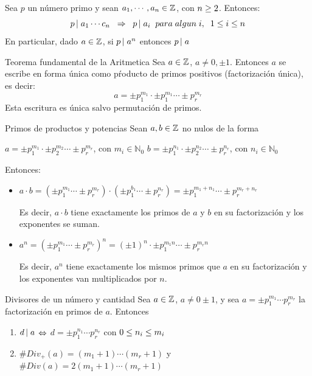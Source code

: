 \documentclass[10pt]{article}
\newcommand{\nat}[1]{\mathbb{N}^{#1}}
\begin{document}
\begin{propo}{}
 Sea $p$ un número primo y sean $a_1, \cdots, a_n \in \entero{}$, con $n \mayig2$. Entonces:
 \[\divi{p}{a_1} \cdots c_n \es{0.2} \implica \es{0.2} \divi{p}{a_i}\es{0.2} para \es{0.1} algun \es{0.1} i, \es{0.2} 1 \menig i \menig n\]
 En particular, dado $a \in \entero{}$, si $\divi{p}{a^n}$ entonces $\divi{p}{a}$
\end{propo}

\begin{teo}{Teorema fundamental de la Aritmetica}
 Sea $a \in \entero{}$, $a \neq 0, \pm 1$. Entonces $a$ se escribe en forma única como pŕoducto de primos positivos (factorización única), es decir:
 \[a = \pm p_1^{m_1} \cdot \pm p_1^{m_1} \cdots \pm p_r^{m_r} \]
 Esta escritura es única salvo permutación de primos.
\end{teo}

\begin{obs}{Primos de productos y potencias}
Sean $a,b \in \entero{}$ no nulos de la forma 
\begin{center}
 $a = \pm p_1^{m_1} \cdot \pm p_2^{m_2} \cdots \pm p_r^{m_r}$, con $m_i \in \nat{}_0$
 $b = \pm p_1^{n_1} \cdot \pm p_2^{n_2} \cdots \pm p_r^{n_r}$, con $n_i \in \nat{}_0$
 \end{center}
 Entonces:
 \begin{itemize}
  \item $a \cdot b = (\pm p_1^{m_1}  \cdots \pm p_r^{m_r}) \cdot (\pm p_1^{b_1}  \cdots \pm p_r^{n_r}) = \pm p_1^{m_1 + n_1}  \cdots \pm p_r^{m_r + n_r}$
  
  Es decir, $a \cdot b$ tiene exactamente los primos de $a$ y $b$ en su factorización y los exponentes se suman.
  \item $a^n = (\pm p_1^{m_1}  \cdots \pm p_r^{m_r})^n = (\pm 1)^n \cdot \pm p_1^{m_1 n}  \cdots \pm p_r^{m_r n}$
  
  Es decir, $a^n$ tiene exactamente los mismos primos que $a$ en su factorización y los exponentes van multiplicados por $n$.
 \end{itemize}
\end{obs}

\begin{propo}{Divisores de un número y cantidad}
 Sea $a \in \entero{}$, $a \neq 0 \pm 1$, y sea $a = \pm p_1^{m_1} \cdots p_r^{m_r}$ la factorización en primos de $a$. Entonces
 \begin{enumerate}
  \item $\divi{d}{a}$ $\sii$ $d = \pm p_1^{n_1} \cdots p_r^{n_r}$ con $0 \menig n_i \menig m_i$
  \item $\# Div_+(a) = (m_1 + 1) \cdots (m_r + 1)$ y $\# Div(a) =2 (m_1 + 1) \cdots (m_r + 1)$ 
 \end{enumerate}
\end{propo}
\end{document}
